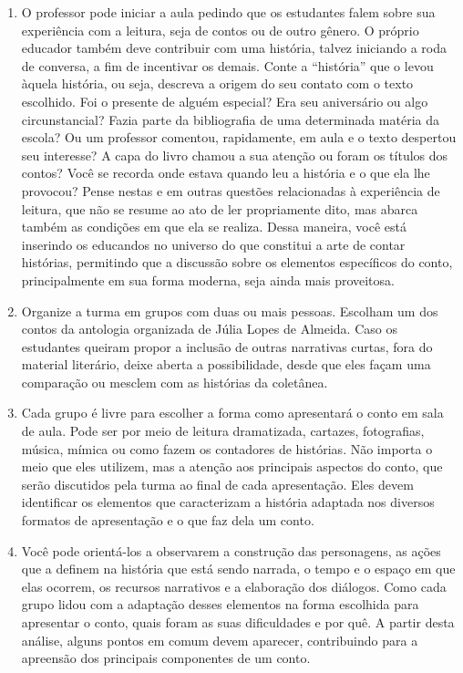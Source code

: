 \documentclass[12pt]{extarticle}
\begin{document}
\begin{enumerate}
\item
O professor pode iniciar a aula pedindo que os
estudantes falem sobre sua experiência com a leitura, seja de contos ou
de outro gênero. O próprio educador também deve contribuir com uma
história, talvez iniciando a roda de conversa, a fim de incentivar os
demais. Conte a ``história'' que o levou àquela história, ou seja,
descreva a origem do seu contato com o texto escolhido. Foi o presente
de alguém especial? Era seu aniversário ou algo circunstancial? Fazia
parte da bibliografia de uma determinada matéria da escola? Ou um
professor comentou, rapidamente, em aula e o texto despertou seu
interesse? A capa do livro chamou a sua atenção ou foram os títulos dos
contos? Você se recorda onde estava quando leu a história e o que ela
lhe provocou? Pense nestas e em outras questões relacionadas à
experiência de leitura, que não se resume ao ato de ler propriamente
dito, mas abarca também as condições em que ela se realiza. Dessa
maneira, você está inserindo os educandos no universo do que constitui a
arte de contar histórias, permitindo que a discussão sobre os elementos
específicos do conto, principalmente em sua forma moderna, seja ainda
mais proveitosa.

\item
Organize a turma em grupos com duas ou mais pessoas. Escolham um dos contos
da antologia organizada de Júlia Lopes de Almeida. Caso os estudantes
queiram propor a inclusão de outras narrativas curtas, fora do material
literário, deixe aberta a possibilidade, desde que eles façam uma
comparação ou mesclem com as histórias da coletânea.

\item
Cada grupo é livre para escolher a forma como apresentará o conto em
sala de aula. Pode ser por meio de leitura dramatizada, cartazes,
fotografias, música, mímica ou como fazem os contadores de histórias.
Não importa o meio que eles utilizem, mas a atenção aos principais
aspectos do conto, que serão discutidos pela turma ao final de cada
apresentação. Eles devem identificar os elementos que caracterizam a
história adaptada nos diversos formatos de apresentação e o que faz dela
um conto.

\item
Você pode orientá-los a observarem a construção das personagens, as
ações que a definem na história que está sendo narrada, o tempo e o
espaço em que elas ocorrem, os recursos narrativos e a elaboração dos
diálogos. Como cada grupo lidou com a adaptação desses elementos na
forma escolhida para apresentar o conto, quais foram as suas
dificuldades e por quê. A partir desta análise, alguns pontos em comum
devem aparecer, contribuindo para a apreensão dos principais componentes
de um conto.


\end{enumerate}
\end{document}
